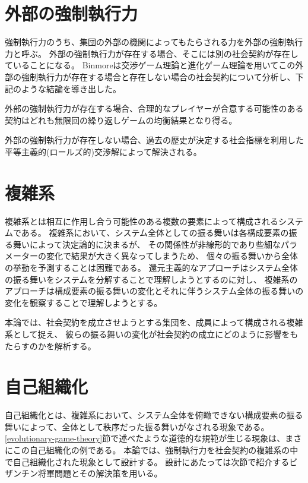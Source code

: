 \section{外部の強制執行力}
強制執行力のうち、集団の外部の機関によってもたらされる力を外部の強制執行力と呼ぶ。
外部の強制執行力が存在する場合、そこには別の社会契約が存在していることになる。
Binmoreは交渉ゲーム理論と進化ゲーム理論を用いてこの外部の強制執行力が存在する場合と存在しない場合の社会契約について分析し、下記のような結論を導き出した。\cite{binmore2005}

\begin{description}
  \item 外部の強制執行力が存在する場合、合理的なプレイヤーが合意する可能性のある契約はどれも無限回の繰り返しゲームの均衡結果となり得る。
  \item 外部の強制執行力が存在しない場合、過去の歴史が決定する社会指標を利用した平等主義的(ロールズ的)交渉解によって解決される。 
\end{description}


\section{複雑系}
複雑系とは相互に作用し合う可能性のある複数の要素によって構成されるシステムである。
複雑系において、システム全体としての振る舞いは各構成要素の振る舞いによって決定論的に決まるが、
その関係性が非線形的であり些細なパラメーターの変化で結果が大きく異なってしまうため、
個々の振る舞いから全体の挙動を予測することは困難である。
還元主義的なアプローチはシステム全体の振る舞いをシステムを分解することで理解しようとするのに対し、
複雑系のアプローチは構成要素の振る舞いの変化とそれに伴うシステム全体の振る舞いの変化を観察することで理解しようとする。

本論では、社会契約を成立させようとする集団を、成員によって構成される複雑系として捉え、
彼らの振る舞いの変化が社会契約の成立にどのように影響をもたらすのかを解析する。

\section{自己組織化}
自己組織化とは、複雑系において、システム全体を俯瞰できない構成要素の振る舞いによって、全体として秩序だった振る舞いがなされる現象である。
\ref{evolutionary-game-theory}節で述べたような道徳的な規範が生じる現象は、まさにこの自己組織化の例である。
本論では、強制執行力を社会契約の複雑系の中で自己組織化された現象として設計する。
設計にあたっては次節で紹介するビザンチン将軍問題とその解決策を用いる。

